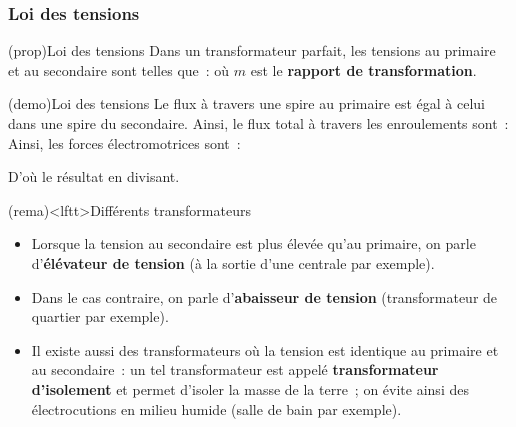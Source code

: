 \documentclass[../../main/main.tex]{subfiles}
\begin{document}
\vspace{-10pt}
\subsubsection{Loi des tensions}

\begin{tcb*}(prop){Loi des tensions}
	Dans un transformateur parfait, les tensions au primaire et au secondaire sont
	telles que~:
	\psw{%
		\[
			\boxed{\frac{u_2 (t)}{u_1 (t)} = \frac{N_2}{N_1} = m}
		\]
	}%
	où $m$ est le \textbf{rapport de transformation}.
\end{tcb*}

\begin{tcb*}(demo){Loi des tensions}
	Le flux à travers une spire au primaire est égal à celui dans une spire du
	secondaire. Ainsi, le flux total à travers les enroulements sont~:
	\psw{%
		\[
			\F_{1, \mathrm{tot}} = N_1 \F
			\qqet
			\F_{2, \mathrm{tot}} = N_2 \F
			\qqav
			\F = BS
		\]
	}%
	Ainsi, les forces électromotrices sont~:
	\smallbreak
	\begin{isd}
		\vspace{-15pt}
		\tcblower
		\vspace{-15pt}
	\end{isd}
	D'où le résultat en divisant.
\end{tcb*}

\begin{tcb}(rema)<lftt>{Différents transformateurs}
	\begin{itemize}
		\item Lorsque la tension au secondaire est plus élevée qu'au primaire, on
		      parle d'\textbf{élévateur de tension} (à la sortie d'une centrale par
		      exemple).
		\item Dans le cas contraire, on parle d'\textbf{abaisseur de tension}
		      (transformateur de quartier par exemple).
		\item Il existe aussi des transformateurs où la tension est identique au
		      primaire et au secondaire~: un tel transformateur est appelé
		      \textbf{transformateur d'isolement} et permet d'isoler la masse de la terre~;
		      on évite ainsi des électrocutions en milieu humide (salle de bain par
		      exemple).
	\end{itemize}
\end{tcb}
\end{document}
